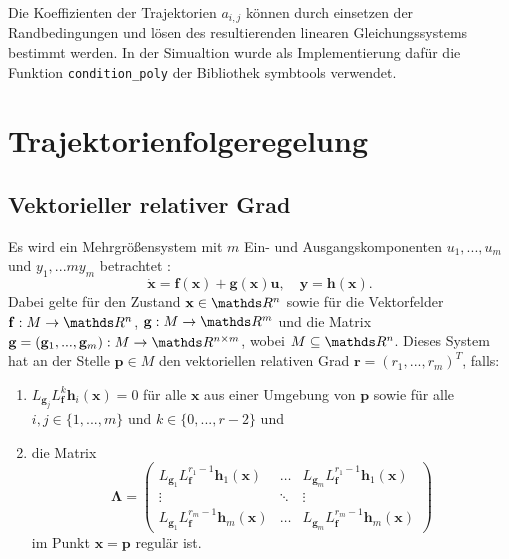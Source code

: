 Die Koeffizienten der Trajektorien $a_{i, j}$ können durch einsetzen der Randbedingungen und lösen des resultierenden linearen Gleichungssystems bestimmt werden. In der Simualtion wurde als Implementierung dafür die Funktion \texttt{condition\_poly} der Bibliothek symbtools verwendet.


\section{Trajektorienfolgeregelung}

\subsection{Vektorieller relativer Grad}
Es wird ein Mehrgrößensystem mit $m$ Ein- und Ausgangskomponenten $u_1, ..., u_m$ und $y_1, ...m y_m$ betrachtet \cite[S. 194]{NLRT_Roebenack}:
\begin{equation}
	\dot{\mathbf{x}} = \mathbf{f}(\mathbf{x}) + \mathbf{g}(\mathbf{x}) \mathbf{u}, \quad \mathbf{y} = \mathbf{h}(\mathbf{x}).
\end{equation}
Dabei gelte für den Zustand $\mathbf{x} \in \Reals^n$ sowie für die Vektorfelder $\mathbf{f}: M \rightarrow \Reals^n$, $\mathbf{g}: M \rightarrow \Reals^m$ und die Matrix $\mathbf{g} = (\mathbf{g}_1, ..., \mathbf{g}_m): M \rightarrow \Reals^{n \times m}$, wobei $M \subseteq \Reals^{n}$. Dieses System hat an der Stelle $\mathbf{p} \in M$ den vektoriellen relativen Grad $\mathbf{r} = (r_1, ..., r_m)^T$, falls:
\begin{enumerate}
	\item $L_{\mathbf{g}_j} L_{\mathbf{f}}^k \mathbf{h}_i(\mathbf{x}) = 0$ für alle $\mathbf{x}$ aus einer Umgebung von $\mathbf{p}$ sowie für alle $i,j \in \{1, ..., m\}$ und $k \in \{0, ..., r-2\}$ und
	\item die Matrix
	\begin{equation*}
		\mathbf{\Lambda} = 
		\left(\begin{matrix}
		L_{\mathbf{g}_1} L_{\mathbf{f}}^{r_1 -1} \mathbf{h}_1(\mathbf{x}) & \hdots & L_{\mathbf{g}_m} L_{\mathbf{f}}^{r_1 -1} \mathbf{h}_1(\mathbf{x}) \\
		\vdots & \ddots & \vdots \\
		L_{\mathbf{g}_1} L_{\mathbf{f}}^{r_m -1} \mathbf{h}_m(\mathbf{x}) & \hdots & L_{\mathbf{g}_m} L_{\mathbf{f}}^{r_m -1} \mathbf{h}_m(\mathbf{x})
		\end{matrix}\right) 
	\end{equation*}
	im Punkt $\mathbf{x} = \mathbf{p}$ regulär ist.
\end{enumerate}

